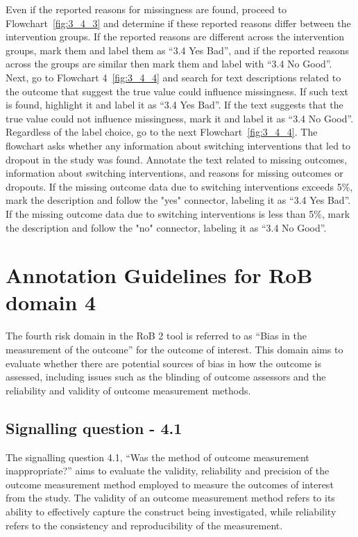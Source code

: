 \documentclass[sn-mathphys,Numbered]{sn-jnl}%
\begin{document}
Even if the reported reasons for missingness are found, proceed to Flowchart~\ref{fig:3_4_3} and determine if these reported reasons differ between the intervention groups.
If the reported reasons are different across the intervention groups, mark them and label them as ``3.4 Yes Bad'', and if the reported reasons across the groups are similar then mark them and label with ``3.4 No Good''.
Next, go to Flowchart 4~\ref{fig:3_4_4} and search for text descriptions related to the outcome that suggest the true value could influence missingness.
If such text is found, highlight it and label it as ``3.4 Yes Bad''.
If the text suggests that the true value could not influence missingness, mark it and label it as ``3.4 No Good''.
Regardless of the label choice, go to the next Flowchart~\ref{fig:3_4_4}.
The flowchart asks whether any information about switching interventions that led to dropout in the study was found.
Annotate the text related to missing outcomes, information about switching interventions, and reasons for missing outcomes or dropouts.
If the missing outcome data due to switching interventions exceeds 5\%, mark the description and follow the "yes" connector, labeling it as ``3.4 Yes Bad''.
If the missing outcome data due to switching interventions is less than 5\%, mark the description and follow the "no" connector, labeling it as ``3.4 No Good''.


%
%
%
\section*{Annotation Guidelines for RoB domain 4}
\label{sec:dom4}
%
The fourth risk domain in the RoB 2 tool is referred to as ``Bias in the measurement of the outcome'' for the outcome of interest.
This domain aims to evaluate whether there are potential sources of bias in how the outcome is assessed, including issues such as the blinding of outcome assessors and the reliability and validity of outcome measurement methods.
%
%
%
\subsection*{Signalling question - 4.1 }
\label{subsec:4_1}
%
The signalling question 4.1, ``Was the method of outcome measurement inappropriate?'' aims to evaluate the validity, reliability and precision of the outcome measurement method employed to measure the outcomes of interest from the study.
The validity of an outcome measurement method refers to its ability to effectively capture the construct being investigated, while reliability refers to the consistency and reproducibility of the measurement.
\end{document}
